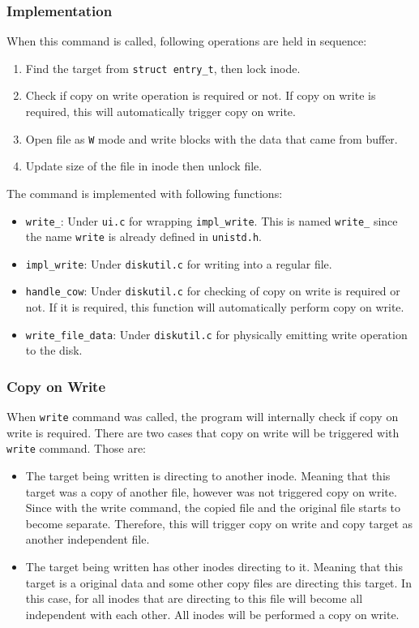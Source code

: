 \documentclass{homework}
\begin{document}
\subsubsection{Implementation}
When this command is called, following operations are held in sequence:
\begin{enumerate}
    \item Find the target from \texttt{struct entry_t}, then lock inode.
    \item Check if copy on write operation is required or not. If copy on write is required, this will automatically trigger copy on write.
    \item Open file as \texttt{W} mode and write blocks with the data that came from buffer.
    \item Update size of the file in inode then unlock file.
\end{enumerate}

The command is implemented with following functions:
\begin{itemize}
    \item \texttt{write_}: Under \texttt{ui.c} for wrapping \texttt{impl_write}. This is named \texttt{write_} since the name \texttt{write} is already defined in \texttt{unistd.h}.
    \item \texttt{impl_write}: Under \texttt{diskutil.c} for writing into a regular file.
    \item \texttt{handle_cow}: Under \texttt{diskutil.c} for checking of copy on write is required or not. If it is required, this function will automatically perform copy on write.
    \item \texttt{write_file_data}: Under \texttt{diskutil.c} for physically emitting write operation to the disk.
\end{itemize}

\subsubsection{Copy on Write}
When \texttt{write} command was called, the program will internally check if copy on write is required. There are two cases that copy on write will be triggered with \texttt{write} command. Those are:
\begin{itemize}
    \item The target being written is directing to another inode. Meaning that this target was a copy of another file, however was not triggered copy on write. Since with the write command, the copied file and the original file starts to become separate. Therefore, this will trigger copy on write and copy target as another independent file.
    \item The target being written has other inodes directing to it. Meaning that this target is a original data and some other copy files are directing this target. In this case, for all inodes that are directing to this file will become all independent with each other. All inodes will be performed a copy on write.
\end{itemize}
\end{document}
